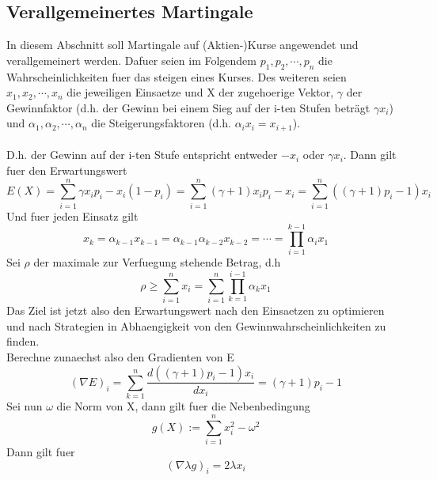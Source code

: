 \documentclass[11pt]{scrartcl}
\begin{document}
		\subsection{Verallgemeinertes Martingale}
			In diesem Abschnitt soll Martingale auf (Aktien-)Kurse angewendet und verallgemeinert werden. Dafuer seien im Folgendem \(p_{1}, p_{2}, \cdots,p_{n}\) die Wahrscheinlichkeiten fuer das steigen eines Kurses. Des weiteren seien \(x_{1}, x_{2}, \cdots,x_{n}\) die jeweiligen Einsaetze und X der zugehoerige Vektor, \(\gamma\) der Gewinnfaktor (d.h. der Gewinn bei einem Sieg auf der i-ten Stufen beträgt \(\gamma x_{i}\)) und \(\alpha_{1}, \alpha_{2}, \cdots,\alpha_{n}\) die Steigerungsfaktoren (d.h. \(\alpha_{i}x_{i}=x_{i+1}\)).\\\\
			D.h. der Gewinn auf der i-ten Stufe entspricht entweder \(-x_{i}\) oder \(\gamma x_{i}\). Dann gilt fuer den Erwartungswert
			\begin{equation}
				E(X)=\sum_{i=1}^n \gamma x_{i}p_{i}-x_{i}(1-p_{i})
				=\sum_{i=1}^n (\gamma+1) x_{i}p_{i}-x_{i}
				=\sum_{i=1}^n ((\gamma +1)p_{i}-1)x_{i}
			\end{equation}
			Und fuer jeden Einsatz gilt
			\begin{equation}
				x_{k}=\alpha_{k-1}x_{k-1}=\alpha_{k-1}\alpha_{k-2}x_{k-2}=\cdots=\prod_{i=1}^{k-1}\alpha_{i}x_{1}
			\end{equation}
			Sei \(\rho\) der maximale zur Verfuegung stehende Betrag, d.h
			\begin{equation}
				\rho \geq \sum_{i=1}^{n}x_{i}=\sum_{i=1}^{n}\prod_{k=1}^{i-1}\alpha_{k}x_{1}
			\end{equation}
			Das Ziel ist jetzt also den Erwartungswert nach den Einsaetzen zu optimieren und nach Strategien in Abhaengigkeit von den Gewinnwahrscheinlichkeiten zu finden.\\
			Berechne zunaechst also den Gradienten von E
			\begin{equation}
				(\nabla E)_{i}=\sum_{k=1}^{n}\frac{d((\gamma +1)p_{i}-1)x_{i}}{dx_{i}}=(\gamma +1)p_{i}-1
			\end{equation}
			Sei nun \(\omega\) die Norm von X, dann gilt fuer die Nebenbedingung
			\begin{equation}
			g(X):=\sum_{i=1}^{n}x_{i}^2-{\omega}^2
			\end{equation}
			Dann gilt fuer 
			\begin{equation}
			(\nabla \lambda g)_{i} = 2\lambda x_{i}
			\end{equation}\\
\end{document}
